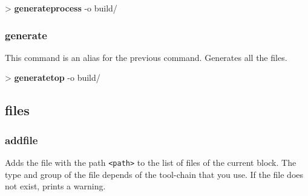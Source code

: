 \documentclass[10pt,a4paper]{article}
\begin{document}

\begin{sampletitle}
> \textbf{\tool{} generateprocess} -o build/
\end{sampletitle}

\subsubsection{generate}

This command is an alias for the  previous command. Generates all the  files.\\


\begin{sampletitle}
> \textbf{\tool{} generatetop} -o build/
\end{sampletitle}


\subsection{files}
\subsubsection{addfile}
\label{subsec:addfile}

Adds the file with the path \texttt{<path>} to the list of files of the current \kind{} block. The type and group of the file depends of the tool-chain that you use. If the file does not exist, prints a warning.\\

\end{document}
